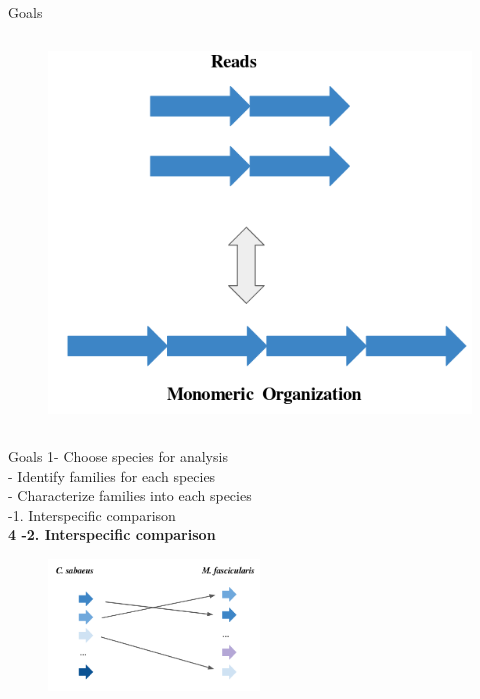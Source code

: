 \documentclass[11pt]{beamer}
\begin{document}
\begin{frame}{Goals}
\begin{columns}
\begin{figure}
			\includegraphics[width=\textwidth]{img/Monomeric_org.png}
		\end{figure}	
		\end{columns}	
	
	
	\begin{flushright}
		\tiny{\insertframenumber}
	\end{flushright}
\end{frame}
\begin{frame}{Goals}
	1- Choose species for analysis \\  - Identify families for each species \\  - Characterize families into each species \\  -1.  Interspecific comparison \\ \medbreak
	\textbf{4 -2.  Interspecific comparison} \\ \medbreak
	\begin{figure}
		\includegraphics[width=0.5\textwidth]{img/comparaison_interespece.png}
	\end{figure}	
\end{frame}
\end{document}
